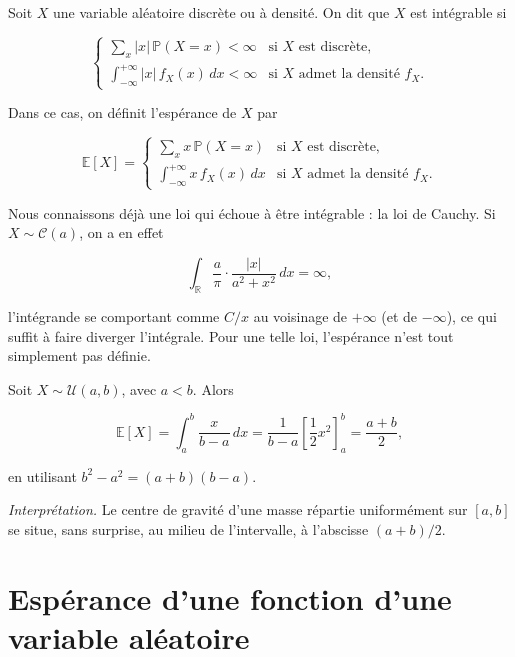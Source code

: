 \begin{mdframed}
\begin{definition}
Soit $X$ une variable aléatoire discrète ou à densité. On dit que $X$ est intégrable si

$$
\begin{cases} \displaystyle\sum_x |x|\, \mathbb{P}(X = x) < \infty & \text{si } X \text{ est discrète}, \\[8pt] \displaystyle\int_{-\infty}^{+\infty} |x|\, f_X(x)\, dx < \infty & \text{si } X \text{ admet la densité } f_X. \end{cases}
$$

Dans ce cas, on définit l'espérance de $X$ par

$$
\mathbb{E}[X] = \begin{cases} \displaystyle\sum_x x\, \mathbb{P}(X = x) & \text{si } X \text{ est discrète}, \\[8pt] \displaystyle\int_{-\infty}^{+\infty} x\, f_X(x)\, dx & \text{si } X \text{ admet la densité } f_X. \end{cases}
$$
\end{definition}
\end{mdframed}

\begin{remarque}
Nous connaissons déjà une loi qui échoue à être intégrable : la loi de Cauchy. Si $X \sim \mathcal{C}(a)$, on a en effet

$$
\int_{\mathbb{R}} \frac{a}{\pi} \cdot \frac{|x|}{a^2 + x^2}\, dx = \infty,
$$

l'intégrande se comportant comme $C/x$ au voisinage de $+\infty$ (et de $-\infty$), ce qui suffit à faire diverger l'intégrale. Pour une telle loi, l'espérance n'est tout simplement pas définie.
\end{remarque}

\begin{exemple}
Soit $X \sim \mathcal{U}(a, b)$, avec $a < b$. Alors

$$
\mathbb{E}[X] = \int_a^b \frac{x}{b - a}\, dx = \frac{1}{b - a} \left[ \frac{1}{2} x^2 \right]_a^b = \frac{a + b}{2},
$$

en utilisant $b^2 - a^2 = (a + b)(b - a)$.

\emph{Interprétation.} Le centre de gravité d'une masse répartie uniformément sur $[a, b]$ se situe, sans surprise, au milieu de l'intervalle, à l'abscisse $(a + b)/2$.
\end{exemple}

\section{Espérance d'une fonction d'une variable aléatoire}

